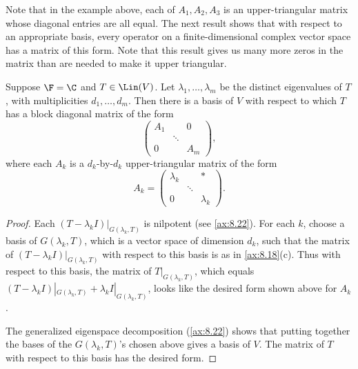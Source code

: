Note that in the example above, each of $A_1,A_2,A_3$ is an upper-triangular
matrix whose diagonal entries are all equal. The next result shows that with
respect to an appropriate basis, every operator on a finite-dimensional complex
vector space has a matrix of this form. Note that this result gives us many
more zeros in the matrix than are needed to make it upper triangular.

\begin{result}\label{ax:8.37}
Suppose $\F=\C$ and $T\in\Lin(V)$. Let $\lambda_1,\dots,\lambda_m$ be the
distinct eigenvalues of $T$, with multiplicities $d_1,\dots,d_m$. Then there is
a basis of $V$ with respect to which $T$ has a block diagonal matrix of the
form
\[ \begin{pmatrix} A_1 & & 0\\ & \ddots & \\ 0 & & A_m \end{pmatrix}, \]
where each $A_k$ is a $d_k$-by-$d_k$ upper-triangular matrix of the form
\[ A_k = \begin{pmatrix} \lambda_k & & *\\ & \ddots & \\ 0 & & \lambda_k
   \end{pmatrix}. \]
\end{result}

\begin{proof}
Each $(T-\lambda_kI)|_{G(\lambda_k,T)}$ is nilpotent (see \ref{ax:8.22}). For
each $k$, choose a basis of $G(\lambda_k,T)$, which is a vector space of
dimension $d_k$, such that the matrix of $(T-\lambda_kI)|_{G(\lambda_k,T)}$
with respect to this basis is as in \ref{ax:8.18}(c). Thus with respect to this
basis, the matrix of $T|_{G(\lambda_k,T)}$, which equals
$(T-\lambda_kI)|_{G(\lambda_k,T)}+\lambda_kI|_{G(\lambda_k,T)}$, looks like the
desired form shown above for $A_k$.

The generalized eigenspace decomposition (\ref{ax:8.22}) shows that putting
together the bases of the $G(\lambda_k,T)$'s chosen above gives a basis of $V$.
The matrix of $T$ with respect to this basis has the desired form.
\end{proof}

